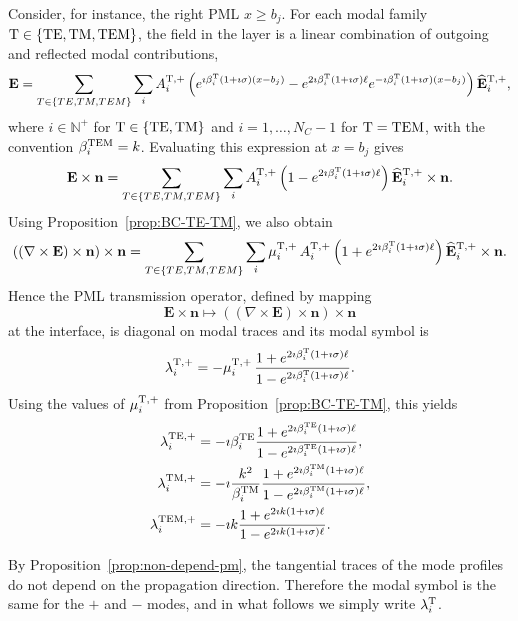 \documentclass[smallextended]{svjour3}       %
\begin{document}
Consider, for instance, the right PML $x\ge b_j$. For each modal family ${\rm T}\in\{{\rm TE,TM,TEM}\}$, the field in the layer is a linear combination of outgoing and reflected modal contributions,
\[
\mathbf E
=
\sum_{T\in\{TE,TM,TEM\}}\sum_{i} A_i^{{\rm T},+}
\left(
e^{\imath \beta_i^{\rm T}(1+\imath\sigma)(x-b_j)}
-
e^{2\imath \beta_i^{\rm T}(1+\imath\sigma)\ell}
e^{-\imath \beta_i^{\rm T}(1+\imath\sigma)(x-b_j)}
\right)
\widehat{\mathbf E}_i^{{\rm T},+},
\]
where $i\in\mathbb N^+$ for ${\rm T}\in\{{\rm TE,TM}\}$ and $i=1,\dots,N_C-1$ for ${\rm T}={\rm TEM}$, with the convention $\beta_i^{\rm TEM}=k$. Evaluating this expression at $x=b_j$ gives
\[
\mathbf E\times \mathbf n
=
\sum_{T\in\{TE,TM,TEM\}}\sum_i
A_i^{{\rm T},+}
\left(
1-
e^{2\imath \beta_i^{\rm T}(1+\imath\sigma)\ell}
\right)
\widehat{\mathbf E}_i^{{\rm T},+}\times \mathbf n.
\]
Using Proposition~\ref{prop:BC-TE-TM}, we also obtain
\[
((\nabla\times \mathbf E)\times \mathbf n)\times \mathbf n
=
\sum_{T\in\{TE,TM,TEM\}}\sum_i
\mu_i^{{\rm T},+}\,
A_i^{{\rm T},+}
\left(
1+
e^{2\imath \beta_i^{\rm T}(1+\imath\sigma)\ell}
\right)
\widehat{\mathbf E}_i^{{\rm T},+}\times \mathbf n.
\]
Hence the PML transmission operator, defined by mapping 
\[\mathbf E\times \mathbf n \longmapsto ((\nabla\times \mathbf E)\times \mathbf n)\times \mathbf n\] 
at the interface, is diagonal on modal traces and its modal symbol is
\begin{equation}\label{eq:lambdaPML-compact}
\lambda_i^{\rm T,+}
=
-\mu_i^{{\rm T},+}\,
\frac{1+e^{2\imath \beta_i^{\rm T}(1+\imath\sigma)\ell}}
     {1-e^{2\imath \beta_i^{\rm T}(1+\imath\sigma)\ell}}.
\end{equation}
Using the values of $\mu_i^{{\rm T},+}$ from Proposition~\ref{prop:BC-TE-TM}, this yields
\begin{align}
\lambda_i^{\rm TE,+}
&=
-\imath \beta_i^{\rm TE}
\frac{1+e^{2\imath \beta_i^{\rm TE}(1+\imath\sigma)\ell}}
     {1-e^{2\imath \beta_i^{\rm TE}(1+\imath\sigma)\ell}},
\\
\lambda_i^{\rm TM,+}
&=
-\imath \frac{k^2}{\beta_i^{\rm TM}}
\frac{1+e^{2\imath \beta_i^{\rm TM}(1+\imath\sigma)\ell}}
     {1-e^{2\imath \beta_i^{\rm TM}(1+\imath\sigma)\ell}},
\\
\lambda_i^{\rm TEM,+}
&=
-\imath k
\frac{1+e^{2\imath k(1+\imath\sigma)\ell}}
     {1-e^{2\imath k(1+\imath\sigma)\ell}}.
\end{align}

By Proposition~\ref{prop:non-depend-pm}, the tangential traces of the mode profiles do not depend on the propagation direction. Therefore the modal symbol is the same for the $+$ and $-$ modes, and in what follows we simply write $\lambda_i^{\rm T}$.
\end{document}
